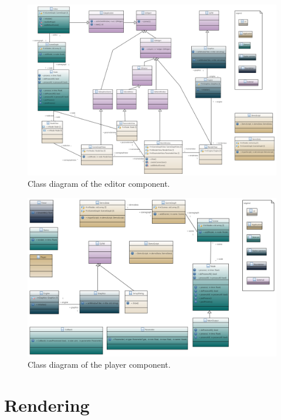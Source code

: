 \documentclass[%
    a4paper,    %
    justified,  %
    nobib,      %
    openany     %
]{tufte-book}
\begin{document}
\begin{figure}[ht]
  \caption{Class diagram of the editor component.}
  \label{fig:editor-class-diagram}
  \includegraphics[width=0.95\linewidth]{images/editor-class-diagram}
\end{figure}

\begin{figure}[ht]
  \caption{Class diagram of the player component.}
  \label{fig:player-class-diagram}
  \includegraphics[width=0.95\linewidth]{images/player-class-diagram}
\end{figure}


\section{Rendering}
\label{sec:rendering}
\end{document}
